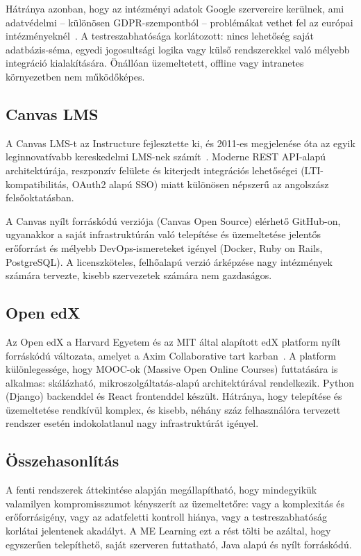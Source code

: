 Hátránya azonban, hogy az intézményi adatok Google szervereire kerülnek, ami adatvédelmi – különösen GDPR-szempontból – problémákat vethet fel az európai intézményeknél~\cite{groen2020gdpr}. A testreszabhatósága korlátozott: nincs lehetőség saját adatbázis-séma, egyedi jogosultsági logika vagy külső rendszerekkel való mélyebb integráció kialakítására. Önállóan üzemeltetett, offline vagy intranetes környezetben nem működőképes.

\subsection{Canvas LMS}

A Canvas LMS-t az Instructure fejlesztette ki, és 2011-es megjelenése óta az egyik leginnovatívabb kereskedelmi LMS-nek számít~\cite{instructure2023canvas}. Moderne REST API-alapú architektúrája, reszponzív felülete és kiterjedt integrációs lehetőségei (LTI-kompatibilitás, OAuth2 alapú SSO) miatt különösen népszerű az angolszász felsőoktatásban.

A Canvas nyílt forráskódú verziója (Canvas Open Source) elérhető GitHub-on, ugyanakkor a saját infrastruktúrán való telepítése és üzemeltetése jelentős erőforrást és mélyebb DevOps-ismereteket igényel (Docker, Ruby on Rails, PostgreSQL). A licenszköteles, felhőalapú verzió árképzése nagy intézmények számára tervezte, kisebb szervezetek számára nem gazdaságos.

\subsection{Open edX}

Az Open edX a Harvard Egyetem és az MIT által alapított edX platform nyílt forráskódú változata, amelyet a Axim Collaborative tart karban~\cite{openedx2023}. A platform különlegessége, hogy MOOC-ok (Massive Open Online Courses) futtatására is alkalmas: skálázható, mikroszolgáltatás-alapú architektúrával rendelkezik. Python (Django) backenddel és React frontenddel készült. Hátránya, hogy telepítése és üzemeltetése rendkívül komplex, és kisebb, néhány száz felhasználóra tervezett rendszer esetén indokolatlanul nagy infrastruktúrát igényel.

\subsection{Összehasonlítás}

A fenti rendszerek áttekintése alapján megállapítható, hogy mindegyikük valamilyen kompromisszumot kényszerít az üzemeltetőre: vagy a komplexitás és erőforrásigény, vagy az adatfeletti kontroll hiánya, vagy a testreszabhatóság korlátai jelentenek akadályt. A ME Learning ezt a rést tölti be azáltal, hogy egyszerűen telepíthető, saját szerveren futtatható, Java alapú és nyílt forráskódú.

